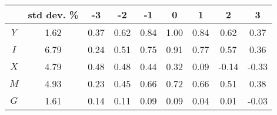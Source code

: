 \begin{tabular}{ccccccccc}
\toprule
 & std dev. \% & -3 & -2 & -1 & 0 & 1 & 2 & 3 \\
\midrule
$Y$ & 1.62 & 0.37 & 0.62 & 0.84 & 1.00 & 0.84 & 0.62 & 0.37 \\
$I$ & 6.79 & 0.24 & 0.51 & 0.75 & 0.91 & 0.77 & 0.57 & 0.36 \\
$X$ & 4.79 & 0.48 & 0.48 & 0.44 & 0.32 & 0.09 & -0.14 & -0.33 \\
$M$ & 4.93 & 0.23 & 0.45 & 0.66 & 0.72 & 0.66 & 0.51 & 0.38 \\
$G$ & 1.61 & 0.14 & 0.11 & 0.09 & 0.09 & 0.04 & 0.01 & -0.03 \\
\bottomrule
\end{tabular}

